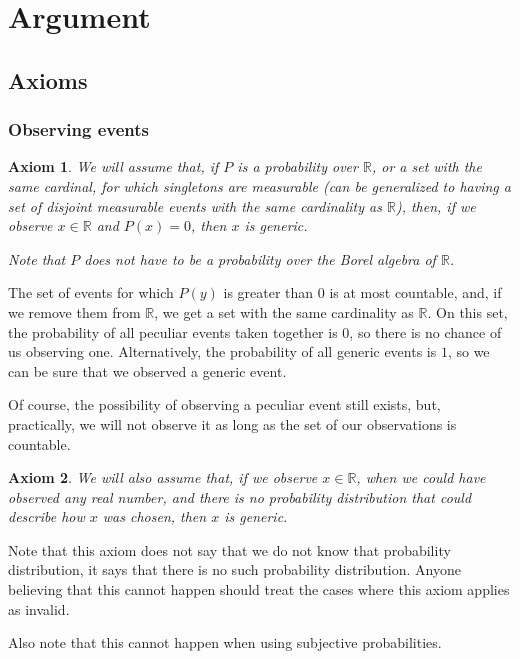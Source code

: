 \documentclass[a4paper
,draft
]{article}
\def\reale{\mathbb{R}}
\newtheorem{axiom}{Axiom}
\begin{document}
\section{Argument}

\subsection{Axioms}

\subsubsection{Observing events}

\begin{axiom}
  We will assume that, if $P$ is a probability over $\reale$, or a set with the
  same cardinal, for which singletons are measurable
  (can be generalized to having a set of disjoint measurable events
  with the same cardinality as $\reale$), then,
  if we observe $x\in\reale$ and $P(x)=0$, then $x$ is generic.

  Note that $P$ does not have to be a probability over the Borel algebra of
  $\reale$.
\end{axiom}

The set of events for which $P(y)$ is
greater than $0$ is at most countable, and, if we remove them from $\reale$, we
get a set with the same cardinality as $\reale$. On this set, the probability
of all peculiar events taken together is $0$, so there is no chance of us
observing one. Alternatively, the probability of all generic events is $1$,
so we can be sure that we observed a generic event.

Of course, the possibility of observing a peculiar event still exists, but,
practically, we will not observe it as long as the set of our
observations is countable.

\begin{axiom}\label{noprobability}
  We will also assume that, if we observe $x\in\reale$, when we could have
  observed any real number, and there is no probability distribution that could
  describe how $x$ was chosen, then $x$ is generic.
\end{axiom}

Note that this axiom does not say that we do not know that probability
distribution, it says that there is no such probability distribution.
Anyone believing that this cannot happen should treat the cases where
this axiom applies as invalid.

Also note that this cannot happen when using subjective probabilities.
\end{document}
